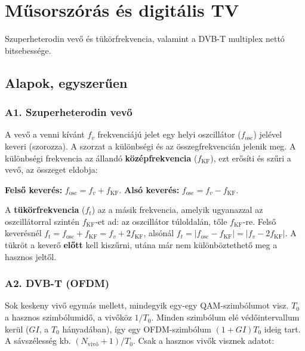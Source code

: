 \setcounter{chapter}{7}
\chapter{\texorpdfstring{Műsorszórás és digitális TV}{Műsorszórás és digitális TV}}\label{f8}
Szuperheterodin vevő és tükörfrekvencia, valamint a DVB-T multiplex nettó bitsebessége.

\section{Alapok, egyszerűen}
\subsection{\texorpdfstring{A1. Szuperheterodin vevő}{A1. Szuperheterodin vevő}}\label{b8-szuper}
A vevő a venni kívánt $f_v$ frekvenciájú jelet egy helyi oszcillátor ($f_\text{osc}$) jelével keveri (szorozza). A szorzat a különbségi és az összegfrekvencián jelenik meg. A különbségi frekvencia az állandó \textbf{középfrekvencia} ($f_\mathrm{KF}$), ezt erősíti és szűri a vevő, az összeget eldobja:

\begin{center}\end{center}

\textbf{Felső keverés:} $f_\text{osc}=f_v+f_\mathrm{KF}$. \textbf{Alsó keverés:} $f_\text{osc}=f_v-f_\mathrm{KF}$.

A \textbf{tükörfrekvencia} ($f_t$) az a másik frekvencia, amelyik ugyanazzal az oszcillátorral szintén $f_\mathrm{KF}$-et ad: az oszcillátor túloldalán, tőle $f_\mathrm{KF}$-re. Felső keverésnél $f_t=f_\text{osc}+f_\mathrm{KF}=f_v+2f_\mathrm{KF}$, alsónál $f_t=|f_\text{osc}-f_\mathrm{KF}|=|f_v-2f_\mathrm{KF}|$. A tükröt a keverő \textbf{előtt} kell kiszűrni, utána már nem különböztethető meg a hasznos jeltől.

\subsection{\texorpdfstring{A2. DVB-T (OFDM)}{A2. DVB-T (OFDM)}}\label{b8-dvb}
Sok keskeny vivő egymás mellett, mindegyik egy-egy QAM-szimbólumot visz. $T_0$ a hasznos szimbólumidő, a vivőköz $1/T_0$. Minden szimbólum elé védőintervallum kerül ($GI$, a $T_0$ hányadában), így egy OFDM-szimbólum $(1+GI)T_0$ ideig tart. A sávszélesség kb. $(N_\text{vivő}+1)/T_0$. Csak a hasznos vivők visznek adatot:


